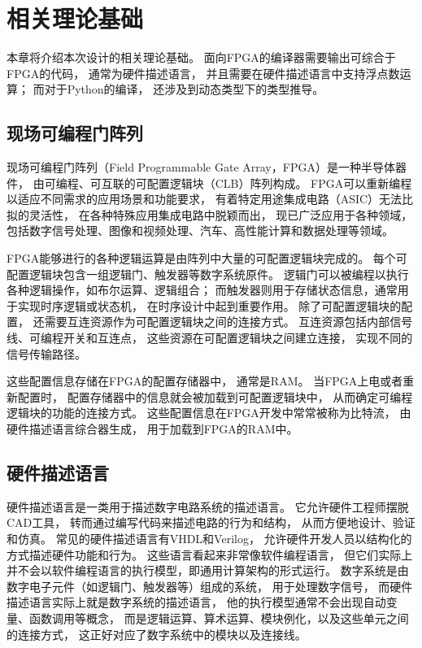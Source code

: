\section{相关理论基础}

本章将介绍本次设计的相关理论基础。
面向FPGA的编译器需要输出可综合于FPGA的代码，
通常为硬件描述语言，
并且需要在硬件描述语言中支持浮点数运算；
而对于Python的编译，
还涉及到动态类型下的类型推导。

\subsection{现场可编程门阵列}

现场可编程门阵列（Field Programmable Gate Array，FPGA）是一种半导体器件，
由可编程、可互联的可配置逻辑块（CLB）阵列构成。
FPGA可以重新编程以适应不同需求的应用场景和功能要求，
有着特定用途集成电路（ASIC）无法比拟的灵活性，
在各种特殊应用集成电路中脱颖而出，
现已广泛应用于各种领域，
包括数字信号处理、图像和视频处理、汽车、高性能计算和数据处理等领域。

FPGA能够进行的各种逻辑运算是由阵列中大量的可配置逻辑块完成的\cite{fpgaarch}。
每个可配置逻辑块包含一组逻辑门、触发器等数字系统原件。
逻辑门可以被编程以执行各种逻辑操作，如布尔运算、逻辑组合；
而触发器则用于存储状态信息，通常用于实现时序逻辑或状态机，
在时序设计中起到重要作用。
除了可配置逻辑块的配置，
还需要互连资源作为可配置逻辑块之间的连接方式。
互连资源包括内部信号线、可编程开关和互连点，
这些资源在可配置逻辑块之间建立连接，
实现不同的信号传输路径。

这些配置信息存储在FPGA的配置存储器中，
通常是RAM。
当FPGA上电或者重新配置时，
配置存储器中的信息就会被加载到可配置逻辑块中，
从而确定可编程逻辑块的功能的连接方式。
这些配置信息在FPGA开发中常常被称为比特流，
由硬件描述语言综合器生成，
用于加载到FPGA的RAM中。

\subsection{硬件描述语言}

硬件描述语言是一类用于描述数字电路系统的描述语言。
它允许硬件工程师摆脱CAD工具，
转而通过编写代码来描述电路的行为和结构，
从而方便地设计、验证和仿真。
常见的硬件描述语言有VHDL和Verilog，
允许硬件开发人员以结构化的方式描述硬件功能和行为。
这些语言看起来非常像软件编程语言，
但它们实际上并不会以软件编程语言的执行模型，即通用计算架构的形式运行。
数字系统是由数字电子元件（如逻辑门、触发器等）组成的系统，
用于处理数字信号，
而硬件描述语言实际上就是数字系统的描述语言，
他的执行模型通常不会出现自动变量、函数调用等概念，
而是逻辑运算、算术运算、模块例化，以及这些单元之间的连接方式，
这正好对应了数字系统中的模块以及连接线。

